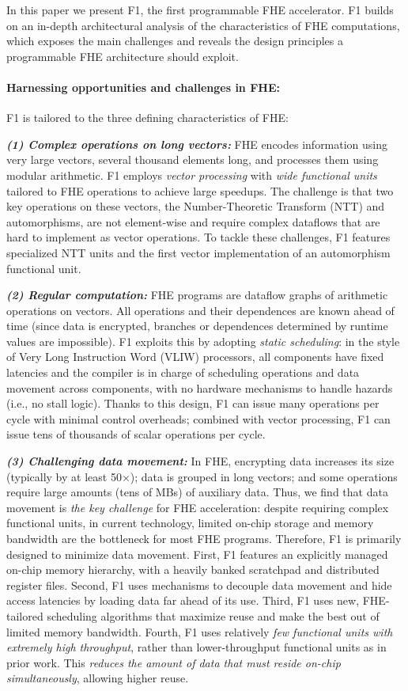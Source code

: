 In this paper we present F1, the first programmable FHE accelerator. F1 builds
on an in-depth architectural analysis of the characteristics of FHE
computations, which exposes the main challenges and reveals the design
principles a programmable FHE architecture should exploit.

\paragraph{Harnessing opportunities and challenges in FHE:}
F1 is tailored to the three defining characteristics of FHE:

\noindent \textbf{\emph{(1) Complex operations on long vectors:}}
FHE encodes information using very large vectors, several thousand elements
long, and processes them using modular arithmetic. F1 employs \emph{vector
processing} with \emph{wide functional units} tailored to FHE operations to
achieve large speedups. The challenge is that two key operations on these
vectors, the Number-Theoretic Transform (NTT) and automorphisms, are not
element-wise and require complex dataflows that are hard to implement as vector
operations. To tackle these challenges, F1 features specialized NTT units and
the first vector implementation of an automorphism functional unit.

\noindent \textbf{\emph{(2) Regular computation:}}
FHE programs are dataflow graphs of arithmetic operations on vectors. All
operations and their dependences are known ahead of time (since data is
encrypted, branches or dependences determined by runtime values are
impossible). F1 exploits this by adopting \emph{static scheduling}: in the
style of Very Long Instruction Word (VLIW) processors, all components have
fixed latencies and the compiler is in charge of scheduling operations and data
movement across components, with no hardware mechanisms to handle hazards
(i.e., no stall logic). Thanks to this design, F1 can issue many operations per
cycle with minimal control overheads; combined with vector processing, F1 can
issue tens of thousands of scalar operations per cycle.

\noindent \textbf{\emph{(3) Challenging data movement:}}
In FHE, encrypting data increases its size (typically by at least 50$\times$);
data is grouped in long vectors; and some operations require large amounts
(tens of MBs) of auxiliary data. Thus, we find that data movement is \emph{the
key challenge} for FHE acceleration: despite requiring complex functional
units, in current technology, limited on-chip storage and memory bandwidth are
the bottleneck for most FHE programs. Therefore, F1 is primarily designed to
minimize data movement. First, F1 features an explicitly managed on-chip memory
hierarchy, with a heavily banked scratchpad and distributed register files.
Second, F1 uses mechanisms to decouple data movement and hide access latencies
by loading data far ahead of its use. Third, F1 uses new, FHE-tailored
scheduling algorithms that maximize reuse and make the best out of limited
memory bandwidth. Fourth, F1 uses relatively \emph{few functional units with
extremely high throughput}, rather than lower-throughput functional units as in
prior work. This \emph{reduces the amount of data that must reside on-chip
simultaneously}, allowing higher reuse.

